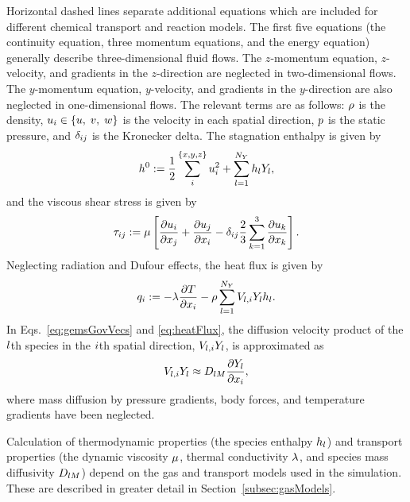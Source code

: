 %
Horizontal dashed lines separate additional equations which are included for different chemical transport and reaction models. The first five equations (the continuity equation, three momentum equations, and the energy equation) generally describe three-dimensional fluid flows. The $z$-momentum equation, $z$-velocity, and gradients in the $z$-direction are neglected in two-dimensional flows. The $y$-momentum equation, $y$-velocity, and gradients in the $y$-direction are also neglected in one-dimensional flows. The relevant terms are as follows: $\rho$ is the density, $u_{i} \in \{u, \; v, \; w\}$ is the velocity in each spatial direction, $p$ is the static pressure, and $\delta_{i j}$ is the Kronecker delta. The stagnation enthalpy is given by
%
\begin{equation}\label{eq:stagEnth}
	h^0 := \frac{1}{2} \sum_{i}^{\{x,y,z\}} u_{i}^2 + \sum_{l = 1}^{N_Y} h_{l} Y_{l},
\end{equation}
%
and the viscous shear stress is given by
%
\begin{equation}\label{eq:shearStress}
	\tau_{i j} := \mu \left[ \frac{\partial u_{i}}{\partial x_{j}} + \frac{\partial u_{j}}{\partial x_{i}} - \delta_{i j} \frac{2}{3} \sum_{k=1}^3 \frac{\partial u_{k}}{\partial x_{k}} \right].
\end{equation}
%
Neglecting radiation and Dufour effects, the heat flux is given by
%
\begin{equation}\label{eq:heatFlux}
	q_{i} := -\lambda \frac{\partial T}{\partial x_{i}} - \rho \sum_{l = 1}^{N_Y} V_{l,i} Y_{l} h_{l}.
\end{equation}
%
In Eqs.~\ref{eq:gemsGovVecs} and \ref{eq:heatFlux}, the diffusion velocity product of the $l$th species in the $i$th spatial direction, $V_{l,i} Y_{l}$, is approximated as
%
\begin{equation}
	V_{l,i} Y_{l} \approx D_{l M} \frac{\partial Y_{l}}{\partial x_{i}},
\end{equation}
%
where mass diffusion by pressure gradients, body forces, and temperature gradients have been neglected.

Calculation of thermodynamic properties (the species enthalpy $h_{l}$) and transport properties (the dynamic viscosity $\mu$, thermal conductivity $\lambda$, and species mass diffusivity $D_{l M}$) depend on the gas and transport models used in the simulation. These are described in greater detail in Section~\ref{subsec:gasModels}.

